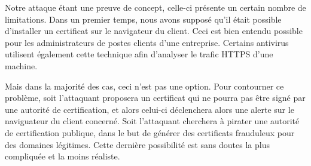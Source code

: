 Notre attaque étant une preuve de concept, celle-ci présente un certain nombre de limitations. Dans un premier temps, nous avons supposé qu'il était possible d'installer un certificat sur le navigateur du client. Ceci est bien entendu possible pour les administrateurs de postes clients d'une entreprise. Certains antivirus utilisent également cette technique afin d'analyser le trafic HTTPS d'une machine.

Mais dans la majorité des cas, ceci n'est pas une option. Pour contourner ce problème, soit l'attaquant proposera un certificat qui ne pourra pas être signé par une autorité de certification, et alors celui-ci déclenchera alors une alerte sur le naviguateur du client concerné. Soit l'attaquant cherchera à pirater une autorité de certification publique, dans le but de générer des certificats frauduleux pour des domaines légitimes. Cette dernière possibilité est sans doutes la plus compliquée et la moins réaliste.

